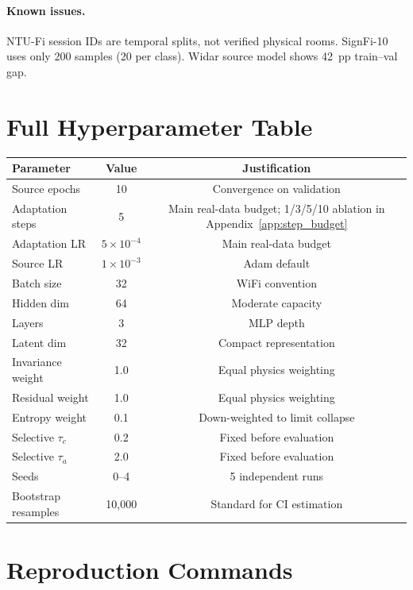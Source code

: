 \paragraph{Known issues.} NTU-Fi session IDs are temporal splits, not verified physical rooms. SignFi-10 uses only 200 samples (20 per class). Widar source model shows 42~pp train--val gap.

\section{Full Hyperparameter Table}
\label{app:hyperparams_full}

\begin{table}[h]
\centering
\small
\begin{tabular}{lcc}
\toprule
\textbf{Parameter} & \textbf{Value} & \textbf{Justification} \\
\midrule
Source epochs & 10 & Convergence on validation \\
Adaptation steps & 5 & Main real-data budget; 1/3/5/10 ablation in Appendix~\ref{app:step_budget} \\
Adaptation LR & $5 \times 10^{-4}$ & Main real-data budget \\
Source LR & $1 \times 10^{-3}$ & Adam default \\
Batch size & 32 & WiFi convention \\
Hidden dim & 64 & Moderate capacity \\
Layers & 3 & MLP depth \\
Latent dim & 32 & Compact representation \\
Invariance weight & 1.0 & Equal physics weighting \\
Residual weight & 1.0 & Equal physics weighting \\
Entropy weight & 0.1 & Down-weighted to limit collapse \\
Selective $\tau_c$ & 0.2 & Fixed before evaluation \\
Selective $\tau_a$ & 2.0 & Fixed before evaluation \\
Seeds & 0--4 & 5 independent runs \\
Bootstrap resamples & 10{,}000 & Standard for CI estimation \\
\bottomrule
\end{tabular}
\end{table}

\section{Reproduction Commands}
\label{app:reproduction}

